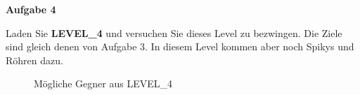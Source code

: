 \documentclass[a4paper,12pt]{article}
\newcommand{\Aufgabe}[1]{
  {
  \textsf{\textbf{Aufgabe #1}}
  
  }
}
\begin{document}

\Aufgabe{4}
Laden Sie \textbf{\mbox{LEVEL\_4}} und versuchen Sie dieses Level zu bezwingen. Die Ziele sind gleich denen von Aufgabe 3. In diesem Level kommen aber noch Spikys und Röhren dazu.
\begin{figure}[H]
	\centering
	\hspace{30px}
	\hspace{30px}
	\caption{Mögliche Gegner aus \mbox{LEVEL\_4}}
\end{figure}
\end{document}
